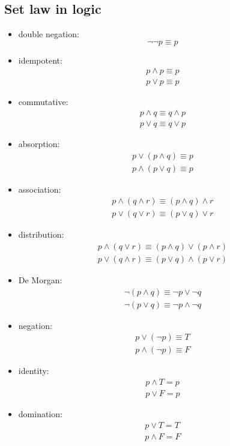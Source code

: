 \documentclass{article}
\begin{document}
\subsection{Set law in logic}
\begin{itemize}
    \item double negation: \[
              \lnot \lnot p \equiv p
          \]
    \item idempotent: \begin{gather*}
              p \land p \equiv p\\
              p \lor p \equiv p
          \end{gather*}
    \item commutative: \begin{gather*}
              p \land q \equiv q \land p\\
              p \lor q \equiv q \lor p
          \end{gather*}
    \item absorption: \begin{gather*}
              p \lor (p \land q) \equiv p\\
              p \land (p \lor q) \equiv  p
          \end{gather*}
    \item association: \begin{gather*}
              p \land ( q \land r) \equiv (p \land q) \land r \\
              p \lor ( q \lor r) \equiv (p \lor q) \lor r
          \end{gather*}
    \item distribution: \begin{gather*}
              p \land ( q \lor r) \equiv (p \land q) \lor (p \land r) \\
              p \lor ( q \land r) \equiv (p \lor q) \land (p \lor r)
          \end{gather*}
    \item De Morgan: \begin{gather*}
              \lnot (p \land q) \equiv \lnot p \lor \lnot q\\
              \lnot (p \lor q) \equiv \lnot p \land \lnot q
          \end{gather*}
    \item negation: \begin{gather*}
              p \lor (\lnot p) \equiv T\\
              p \land (\lnot p ) \equiv F
          \end{gather*}
    \item identity: \begin{gather*}
              p \land T = p\\
              p \lor F = p
          \end{gather*}
    \item domination: \begin{gather*}
              p \lor T = T\\
              p \land F = F
          \end{gather*}

\end{itemize}
\end{document}
